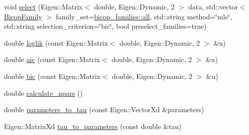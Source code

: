 \begin{DoxyCompactItemize}
void \hyperlink{classvinecopulib_1_1_bicop_af04ef20ec08d02222059ba2b72084ad0}{select} (Eigen\+::\+Matrix$<$ double, Eigen\+::\+Dynamic, 2 $>$ data, std\+::vector$<$ \hyperlink{namespacevinecopulib_a42e95cc06d33896199caab0c11ad44f3}{Bicop\+Family} $>$ family\+\_\+set=\hyperlink{namespacevinecopulib_1_1bicop__families_a5214a513f41ec23b74782aab96ea6774}{bicop\+\_\+families\+::all}, std\+::string method=\char`\"{}mle\char`\"{}, std\+::string selection\+\_\+criterion=\char`\"{}bic\char`\"{}, bool preselect\+\_\+families=true)
\item 
double \hyperlink{classvinecopulib_1_1_bicop_ae8bcc0c3265cc86565333a0cfd3d619d}{loglik} (const Eigen\+::\+Matrix$<$ double, Eigen\+::\+Dynamic, 2 $>$ \&u)
\item 
double \hyperlink{classvinecopulib_1_1_bicop_a9287fec95519fea64a2ae80f5888c709}{aic} (const Eigen\+::\+Matrix$<$ double, Eigen\+::\+Dynamic, 2 $>$ \&u)
\item 
double \hyperlink{classvinecopulib_1_1_bicop_ac1f480d13b3464260c2dd6aa88b2e130}{bic} (const Eigen\+::\+Matrix$<$ double, Eigen\+::\+Dynamic, 2 $>$ \&u)
\item 
double \hyperlink{classvinecopulib_1_1_bicop_a9f3b3b83c54a9e1d809fdee058f3eb11}{calculate\+\_\+npars} ()
\item 
double \hyperlink{classvinecopulib_1_1_bicop_aa25436353dee76e4368fb941a7efa257}{parameters\+\_\+to\+\_\+tau} (const Eigen\+::\+Vector\+Xd \&parameters)
\item 
Eigen\+::\+Matrix\+Xd \hyperlink{classvinecopulib_1_1_bicop_a5809ddc9884f6fb66fe53289be348913}{tau\+\_\+to\+\_\+parameters} (const double \&tau)
\end{DoxyCompactItemize}
